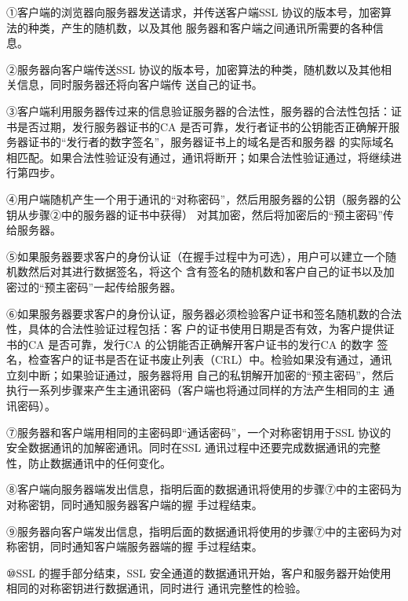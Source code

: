 \documentclass[UTF8]{ctexart}
\begin{document}
①客户端的浏览器向服务器发送请求，并传送客户端SSL 协议的版本号，加密算法的种类，产生的随机数，以及其他
服务器和客户端之间通讯所需要的各种信息。

②服务器向客户端传送SSL 协议的版本号，加密算法的种类，随机数以及其他相关信息，同时服务器还将向客户端传
送自己的证书。

③客户端利用服务器传过来的信息验证服务器的合法性，服务器的合法性包括：证书是否过期，发行服务器证书的CA
 是否可靠，发行者证书的公钥能否正确解开服务器证书的“发行者的数字签名”，服务器证书上的域名是否和服务器
 的实际域名相匹配。如果合法性验证没有通过，通讯将断开；如果合法性验证通过，将继续进行第四步。

④用户端随机产生一个用于通讯的“对称密码”，然后用服务器的公钥（服务器的公钥从步骤②中的服务器的证书中获得）
对其加密，然后将加密后的“预主密码”传给服务器。

⑤如果服务器要求客户的身份认证（在握手过程中为可选），用户可以建立一个随机数然后对其进行数据签名，将这个
含有签名的随机数和客户自己的证书以及加密过的“预主密码”一起传给服务器。

⑥如果服务器要求客户的身份认证，服务器必须检验客户证书和签名随机数的合法性，具体的合法性验证过程包括：客
户的证书使用日期是否有效，为客户提供证书的CA 是否可靠，发行CA 的公钥能否正确解开客户证书的发行CA 的数字
签名，检查客户的证书是否在证书废止列表（CRL）中。检验如果没有通过，通讯立刻中断；如果验证通过，服务器将用
自己的私钥解开加密的“预主密码”，然后执行一系列步骤来产生主通讯密码（客户端也将通过同样的方法产生相同的主
通讯密码）。

⑦服务器和客户端用相同的主密码即“通话密码”，一个对称密钥用于SSL 协议的安全数据通讯的加解密通讯。同时在SSL
通讯过程中还要完成数据通讯的完整性，防止数据通讯中的任何变化。

⑧客户端向服务器端发出信息，指明后面的数据通讯将使用的步骤⑦中的主密码为对称密钥，同时通知服务器客户端的握
手过程结束。

⑨服务器向客户端发出信息，指明后面的数据通讯将使用的步骤⑦中的主密码为对称密钥，同时通知客户端服务器端的握
手过程结束。

⑩SSL 的握手部分结束，SSL 安全通道的数据通讯开始，客户和服务器开始使用相同的对称密钥进行数据通讯，同时进行
通讯完整性的检验。
\end{document}
